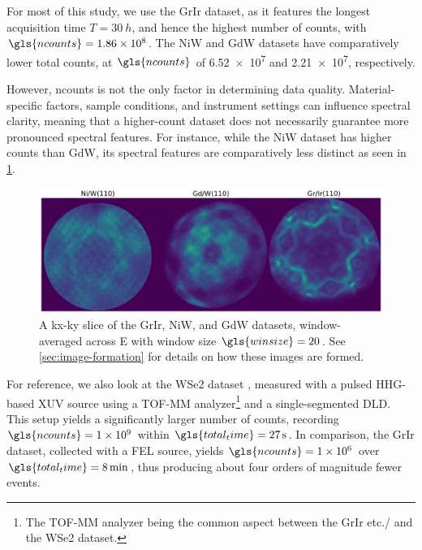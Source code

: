 For most of this study, we use the \gls{GrIr} dataset, as it features the longest acquisition time $T=\qty{30}{h}$, and hence the highest number of counts, with $\gls{ncounts}=\num{1.86e8}$. The \gls{NiW} and \gls{GdW} datasets have comparatively lower total counts, at $\gls{ncounts}$ of \num{6.52e7} and \num{2.21e7}, respectively. 

However, \gls{ncounts} is not the only factor in determining data quality. Material-specific factors, sample conditions, and instrument settings can influence spectral clarity, meaning that a higher-count dataset does not necessarily guarantee more pronounced spectral features. For instance, while the \gls{NiW} dataset has higher counts  than \gls{GdW}, its spectral features are comparatively less distinct as seen in \cref{fig:all-hextof-datasets-kxky}.

\begin{figure}[h]
    \centering
    \includegraphics[width=1\linewidth]{images/datasets_3_kx_ky.pdf}
    \caption{A \gls{kx}-\gls{ky} slice of the \gls{GrIr}, \gls{NiW}, and \gls{GdW} datasets, window-averaged across \gls{E} with window size $\gls{winsize}=\num{20}$. See \cref{sec:image-formation} for details on how these images are formed.}
    \label{fig:all-hextof-datasets-kxky}
\end{figure}

For reference, we also look at the \gls{WSe2} dataset \cite{maklarTimeresolvedARPESRAW2022}, measured with a pulsed \gls{HHG}-based \gls{XUV} source using a \gls{TOF}-\gls{MM} analyzer\footnote{The \gls{TOF}-\gls{MM} analyzer being the common aspect between the \gls{GrIr} etc./ and the \gls{WSe2} dataset.} and a single-segmented \gls{DLD}. This setup yields a significantly larger number of counts, recording $\gls{ncounts}=\num{1e9}$ within $\gls{total_time}=\qty{27}{s}$. In comparison, the \gls{GrIr} dataset, collected with a \gls{FEL} source, yields $\gls{ncounts} = \num{1e6}$ over $\gls{total_time} = \qty{8}{\min}$, thus producing about four orders of magnitude fewer events.

